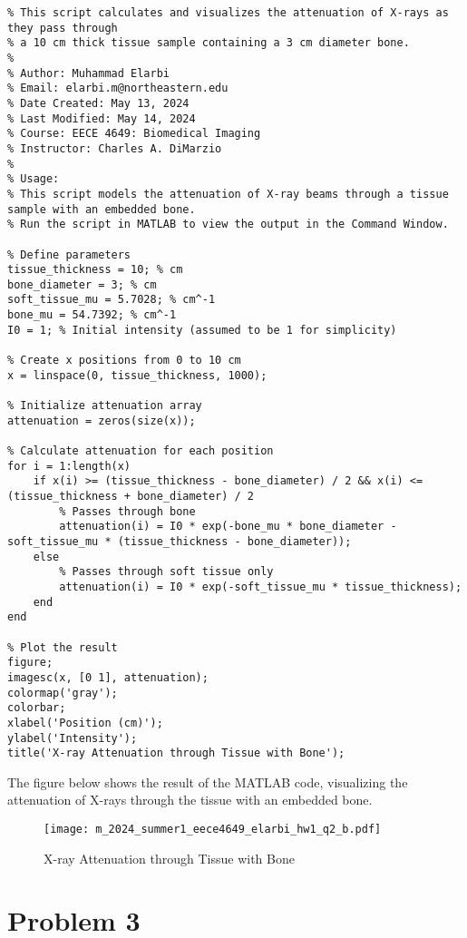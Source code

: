 \documentclass[12pt]{article}
\begin{document}
\begin{lstlisting}[style=Matlab-editor]
% X-ray Attenuation through Tissue with Bone
% This script calculates and visualizes the attenuation of X-rays as they pass through
% a 10 cm thick tissue sample containing a 3 cm diameter bone.
%
% Author: Muhammad Elarbi
% Email: elarbi.m@northeastern.edu
% Date Created: May 13, 2024
% Last Modified: May 14, 2024
% Course: EECE 4649: Biomedical Imaging
% Instructor: Charles A. DiMarzio
%
% Usage:
% This script models the attenuation of X-ray beams through a tissue sample with an embedded bone.
% Run the script in MATLAB to view the output in the Command Window.

% Define parameters
tissue_thickness = 10; % cm
bone_diameter = 3; % cm
soft_tissue_mu = 5.7028; % cm^-1
bone_mu = 54.7392; % cm^-1
I0 = 1; % Initial intensity (assumed to be 1 for simplicity)

% Create x positions from 0 to 10 cm
x = linspace(0, tissue_thickness, 1000);

% Initialize attenuation array
attenuation = zeros(size(x));

% Calculate attenuation for each position
for i = 1:length(x)
    if x(i) >= (tissue_thickness - bone_diameter) / 2 && x(i) <= (tissue_thickness + bone_diameter) / 2
        % Passes through bone
        attenuation(i) = I0 * exp(-bone_mu * bone_diameter - soft_tissue_mu * (tissue_thickness - bone_diameter));
    else
        % Passes through soft tissue only
        attenuation(i) = I0 * exp(-soft_tissue_mu * tissue_thickness);
    end
end

% Plot the result
figure;
imagesc(x, [0 1], attenuation);
colormap('gray');
colorbar;
xlabel('Position (cm)');
ylabel('Intensity');
title('X-ray Attenuation through Tissue with Bone');
\end{lstlisting}

The figure below shows the result of the MATLAB code, visualizing the attenuation of X-rays through the tissue with an embedded bone.

\begin{figure}[h!]
    \centering
    \texttt{[image: m\_2024\_summer1\_eece4649\_elarbi\_hw1\_q2\_b.pdf]}
    \caption{X-ray Attenuation through Tissue with Bone}
    \label{fig:attenuation}
\end{figure}


\newpage
\section*{Problem 3}
\end{document}
